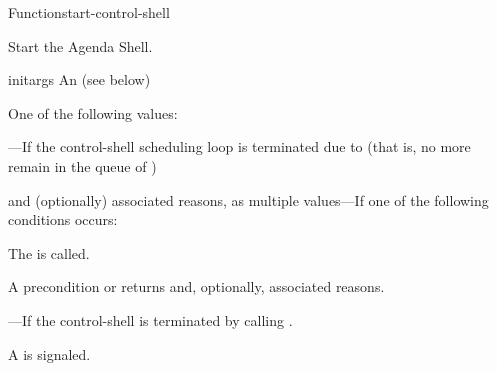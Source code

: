 \documentclass[10pt,twoside,english,pdftex]{article}
\begin{document}
\begin{functiondoc}{Function}{start-control-shell}%
  { 
    \returns{} \superstar}
%
%
%
%

\fnsyntax

\fnpurpose Start the Agenda Shell.

\fnpackage {}

\fnmodule {}

\fnargs
\begin{args}{initargs}
\arg[initargs] An  (see below)
\end{args}

\fnreturns
One of the following values: 

\begin{tightitemize}
\item {}---If the control-shell scheduling loop is terminated
  due to  (that is, no more  remain
  in the queue of )
\item {} and (optionally) associated reasons, as multiple
  values---If one of the following conditions occurs:
\begin{tightitemize}
\item The \textbf{}  is
  called.
\item A precondition  or  
  returns  and, optionally, associated reasons.
\end{tightitemize}
\item {}---If the control-shell is terminated by
  calling \textbf{}.
\end{tightitemize}

\fnevents
{}%
%
%
%
%
%
A  is signaled.
 
\fnerrors
\threadsnotstarted


\end{functiondoc}
\end{document}
